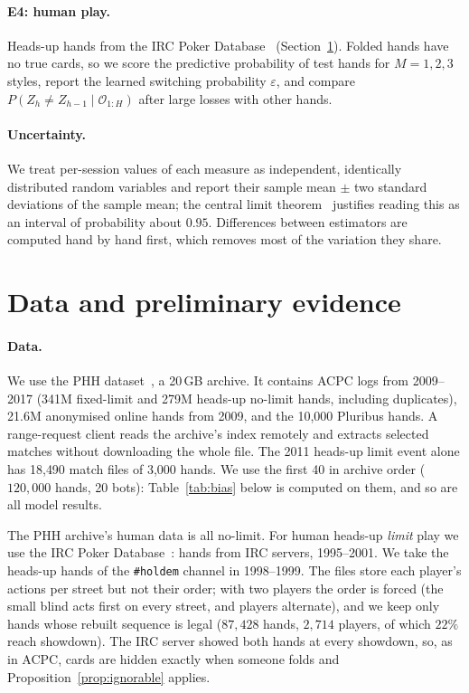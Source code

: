 \documentclass[11pt,a4paper]{article}
\newcommand{\Z}{Z}            %
\newcommand{\1}{\mathbf{1}}
\newcommand{\BT}[1]{\cite[§#1]{bertsekas2000}}
\begin{document}
\paragraph{E4: human play.} Heads-up hands from the IRC Poker
Database~\cite{ircdb} (Section~\ref{sec:prelim}). Folded hands have no true
cards, so we score the predictive probability of test hands for $M=1,2,3$
styles, report the learned switching probability $\varepsilon$, and compare
$P(\Z_h\neq\Z_{h-1}\mid\mathcal{O}_{1:H})$ after large losses with other hands.

\paragraph{Uncertainty.} We treat per-session values of each measure as
independent, identically distributed random variables and report their sample
mean $\pm$ two standard deviations of the sample mean; the central limit
theorem~\BT{7.4} justifies reading this as an interval of probability about
$0.95$. Differences between estimators are computed hand by hand first, which
removes most of the variation they share.

\section{Data and preliminary evidence}\label{sec:prelim}

\paragraph{Data.} We use the PHH dataset~\cite{kim2024,phhdata}, a 20\,GB
archive. It contains ACPC logs from 2009--2017 (341M fixed-limit and 279M
heads-up no-limit hands, including duplicates), 21.6M anonymised online hands
from 2009, and the 10{,}000 Pluribus hands. A range-request client reads the
archive's index remotely and extracts selected matches without downloading the
whole file. The 2011 heads-up limit event alone has 18{,}490 match files of
3{,}000 hands. We use the first 40 in archive order ($120{,}000$ hands, 20
bots): Table~\ref{tab:bias} below is computed on them, and so are all model
results.

The PHH archive's human data is all no-limit. For human heads-up \emph{limit}
play we use the IRC Poker Database~\cite{ircdb}: hands from IRC servers,
1995--2001. We take the heads-up hands of the \texttt{\#holdem} channel in
1998--1999. The files store each player's actions per street but not their
order; with two players the order is forced (the small blind acts first on
every street, and players alternate), and we keep only hands whose rebuilt
sequence is legal ($87{,}428$ hands, $2{,}714$ players, of which $22\%$ reach
showdown). The IRC server showed both hands at every showdown, so, as in ACPC,
cards are hidden exactly when someone folds and Proposition~\ref{prop:ignorable}
applies.
\end{document}

